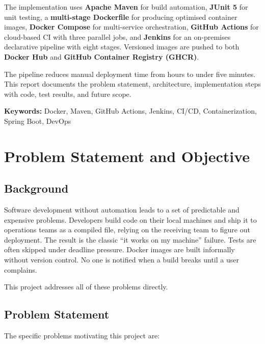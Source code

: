\documentclass[12pt,a4paper]{report}
\begin{document}
The implementation uses \textbf{Apache Maven} for build automation, \textbf{JUnit 5} for unit testing, a \textbf{multi-stage Dockerfile} for producing optimised container images, \textbf{Docker Compose} for multi-service orchestration, \textbf{GitHub Actions} for cloud-based CI with three parallel jobs, and \textbf{Jenkins} for an on-premises declarative pipeline with eight stages. Versioned images are pushed to both \textbf{Docker Hub} and \textbf{GitHub Container Registry (GHCR)}.

The pipeline reduces manual deployment time from hours to under five minutes. This report documents the problem statement, architecture, implementation steps with code, test results, and future scope.

\textbf{Keywords:} Docker, Maven, GitHub Actions, Jenkins, CI/CD, Containerization, Spring Boot, DevOps

\tableofcontents
\listoffigures
\newpage

\chapter{Problem Statement and Objective}

\section{Background}

Software development without automation leads to a set of predictable and expensive problems. Developers build code on their local machines and ship it to operations teams as a compiled file, relying on the receiving team to figure out deployment. The result is the classic ``it works on my machine'' failure. Tests are often skipped under deadline pressure. Docker images are built informally without version control. No one is notified when a build breaks until a user complains.

This project addresses all of these problems directly.

\section{Problem Statement}

The specific problems motivating this project are:
\end{document}
